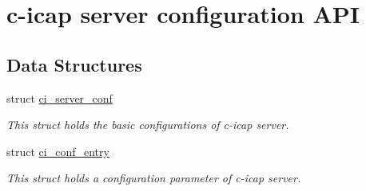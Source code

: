 \hypertarget{group__CONFIG}{
\section{c-\/icap server configuration API}
\label{group__CONFIG}
}
\subsection*{Data Structures}
\begin{DoxyCompactItemize}
\item 
struct \hyperlink{structci__server__conf}{ci\_\-server\_\-conf}
\begin{DoxyCompactList}\small\item\em This struct holds the basic configurations of c-\/icap server. \item\end{DoxyCompactList}\item 
struct \hyperlink{structci__conf__entry}{ci\_\-conf\_\-entry}
\begin{DoxyCompactList}\small\item\em This struct holds a configuration parameter of c-\/icap server. \item\end{DoxyCompactList}\end{DoxyCompactItemize}
